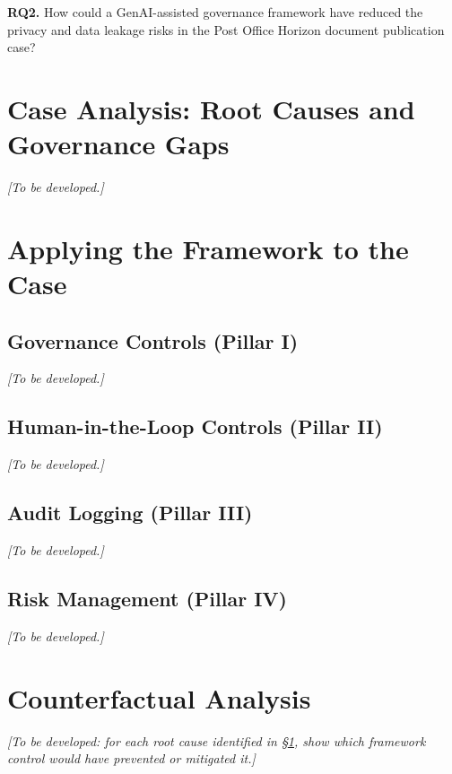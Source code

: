 \documentclass[12pt,a4paper]{article}
\begin{document}
\begin{quotebox}
\textbf{RQ2.} How could a GenAI-assisted governance framework have reduced the privacy and data leakage risks in the Post Office Horizon document publication case?
\end{quotebox}

\section{Case Analysis: Root Causes and Governance Gaps}
\label{sec:rq2_case}
\textit{[To be developed.]}

\section{Applying the Framework to the Case}
\label{sec:rq2_apply}

\subsection{Governance Controls (Pillar I)}
\textit{[To be developed.]}

\subsection{Human-in-the-Loop Controls (Pillar II)}
\textit{[To be developed.]}

\subsection{Audit Logging (Pillar III)}
\textit{[To be developed.]}

\subsection{Risk Management (Pillar IV)}
\textit{[To be developed.]}

\section{Counterfactual Analysis}
\label{sec:rq2_counterfactual}

\textit{[To be developed: for each root cause identified in \S\ref{sec:rq2_case}, show which framework control would have prevented or mitigated it.]}
\end{document}
